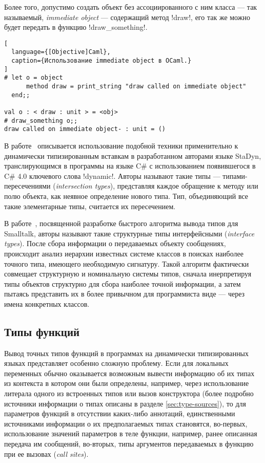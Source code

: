 Более того, допустимо создать объект без ассоциированного с ним класса --- так
называемый, \emph{immediate object} --- содержащий метод !draw!, его так же можно
будет передать в функцию !draw_something!.

\begin{lstlisting}[
  language={[Objective]Caml},
  caption={Использование immediate object в OCaml.}
]
# let o = object
      method draw = print_string "draw called on immediate object"
  end;;

val o : < draw : unit > = <obj>
# draw_something o;;
draw called on immediate object- : unit = ()
\end{lstlisting}
\lstset{language=Python}

В работе~\cite{Ortin2011:union} описывается использование подобной техники
применительно к динамически типизированным вставкам в разработанном авторами
языке StaDyn, транслирующимся в программы на языке C\# с использованием
появившегося в C\# 4.0 ключевого слова !dynamic!.  Авторы называют такие
типы --- типами-пересечениями (\emph{intersection types}), представляя каждое
обращение к методу или полю объекта, как неявное определение нового типа. Тип,
объединяющий все такие элементарные типы, считается их пересечением.

В работе~\cite{Pluquet2009}, посвященной разработке быстрого алгоритма вывода
типов для Smalltalk, авторы называют такие структурные типы интерфейсными 
(\emph{interface types}). После сбора информации о передаваемых объекту сообщениях,
происходит анализ иерархии известных системе классов в поисках наиболее
точного типа, имеющего необходимую сигнатуру. Такой алгоритм фактически
совмещает структурную и номинальную системы типов, сначала инерпретируя типы
объектов структурно для сбора наиболее точной информации, а затем пытаясь
представить их в более привычном для программиста виде --- через имена
конкретных классов.

\subsection{Типы функций}

Вывод точных типов функций в программах на динамически типизированных языках
представляет особенно сложную проблему. Если для локальных переменных обычно
оказывается возможным вывести информацию об их типах из контекста в котором они
были определены, например, через использование литерала одного из встроенных
типов или вызов конструктора (более подробно источники информации о типах
описаны в разделе \ref{sec:type-sources}), то для параметров функций в
отсутствии каких-либо аннотаций, единственными источниками информации о их
предполагаемых типах становятся, во-первых, использование значений параметров в
теле функции, например, ранее описанная передача им сообщений, во-вторых, типы
аргументов передаваемых в функцию при ее вызовах (\emph{call sites}).

